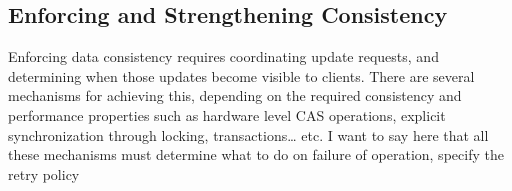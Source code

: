 \documentclass[]{usiinfprospectus}
\begin{document}
\subsection{Enforcing and Strengthening Consistency}

Enforcing data consistency requires coordinating update requests, and determining when those updates become visible to clients.  There are several mechanisms for achieving this, depending on the required consistency and performance properties such as hardware level CAS operations, explicit synchronization through locking, transactions… etc.  I want to say here that all these mechanisms must determine what to do on failure of operation, specify the retry policy




% 
% 
\end{document}
